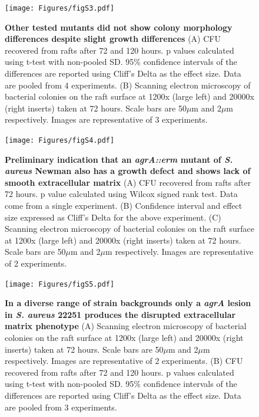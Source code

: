 \documentclass[10pt,letterpaper]{article}
\begin{document}
\begin{figure}[H]
\begin{adjustwidth}{-2.25in}{0in}
\texttt{[image: Figures/figS3.pdf]}
\caption[Other tested mutants did not show colony morphology differences despite slight growth differences]{
	\textbf{Other tested mutants did not show colony morphology differences despite slight growth differences}
	(A) CFU recovered from rafts after 72 and 120 hours. p values calculated using t-test with non-pooled SD. 95\% confidence intervals of the differences are reported using Cliff's Delta as the effect size. Data are pooled from 4 experiments.
	(B) Scanning electron microscopy of bacterial colonies on the raft surface at 1200x (large left) and 20000x (right inserts) taken at 72 hours. Scale bars are 50$\mu$m and 2$\mu$m respectively. Images are representative of 3 experiments.}
        \label{figS3}
        \end{adjustwidth}
\end{figure}

\begin{figure}[H]
\begin{adjustwidth}{-2.25in}{0in}
\texttt{[image: Figures/figS4.pdf]}
\caption[Preliminary indication that an \textit{agrA::erm} mutant of \textit{S. aureus} Newman also has a growth defect and shows lack of smooth extracellular matrix]{
\textbf{Preliminary indication that an \textit{agrA::erm} mutant of \textit{S. aureus} Newman also has a growth defect and shows lack of smooth extracellular matrix}
	(A) CFU recovered from rafts after 72 hours. p value calculated using Wilcox signed rank test. Data come from a single experiment.
	(B) Confidence interval and effect size expressed as Cliff's Delta for the above experiment.
	(C) Scanning electron microscopy of bacterial colonies on the raft surface at 1200x (large left) and 20000x (right inserts) taken at 72 hours. Scale bars are 50$\mu$m and 2$\mu$m respectively. Images are representative of 2 experiments.}
        \label{figS4}
        \end{adjustwidth}
\end{figure}

\begin{figure}[H]
\begin{adjustwidth}{-2.25in}{0in}
\texttt{[image: Figures/figS5.pdf]}
\caption[In a diverse range of strain backgrounds only a \textit{agrA} lesion in \textit{S. aureus} 22251 produces the disrupted extracellular matrix phenotype]{
	\textbf{In a diverse range of strain backgrounds only a \textit{agrA} lesion in \textit{S. aureus} 22251 produces the disrupted extracellular matrix phenotype}
	(A) Scanning electron microscopy of bacterial colonies on the raft surface at 1200x (large left) and 20000x (right inserts) taken at 72 hours. Scale bars are 50$\mu$m and 2$\mu$m respectively. Images are representative of 2 experiments.
	(B) CFU recovered from rafts after 72 and 120 hours. p values calculated using t-test with non-pooled SD. 95\% confidence intervals of the differences are reported using Cliff's Delta as the effect size. Data are pooled from 3 experiments.}
        \label{figS5}
        \end{adjustwidth}
\end{figure}
\end{document}
